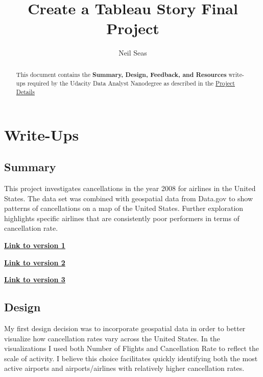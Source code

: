 \documentclass[a4paper,11pt]{report}
\title{Create a Tableau Story Final Project}
\author{Neil Seas}
\begin{document}
\maketitle
\tableofcontents

\begin{abstract}
This document contains the \textbf{Summary, Design, Feedback, and Resources}
write-ups required by the Udacity Data Analyst Nanodegree as described in the
    \href{https://classroom.udacity.com/nanodegrees/nd002/parts/38e740f3-bea2-43cb-a474-1de2abe3ec4b/modules/982dba08-fe94-413f-91ff-0dce5a6e1e16/lessons/9954c4f7-c621-4e22-baf4-60da1150093c/concepts/656b2cfc-9c83-4d19-931a-af681d43f92c}{Project
    Details}
\end{abstract}

\chapter{Write-Ups}
\section{Summary}
This project investigates cancellations in the year 2008 for airlines in the
United States. The data set was combined with geospatial data from Data.gov to
show patterns of cancellations on a map of the United States.  Further
exploration highlights specific airlines that are consistently poor performers
in terms of cancellation rate.

\href{https://public.tableau.com/profile/neil.seas#!/vizhome/UdacityFinalProject/Story1}{\bf{Link
to version 1}}

\href{https://public.tableau.com/profile/neil.seas#!/vizhome/UdacityFinalProjectv2/Story1}{\bf{Link
to version 2}}

\href{https://public.tableau.com/profile/neil.seas#!/vizhome/UdacityFinalProjectv3/Story1}{\bf{Link
to version 3}}

\section{Design}
My first design decision was to incorporate geospatial data in order to better
visualize how cancellation rates vary across the United States.  In the
visualizations I used both Number of Flights and Cancellation Rate to reflect
the scale of activity.  I believe this choice facilitates quickly identifying
both the most active airports and airports/airlines with relatively higher
cancellation rates.
\end{document}
